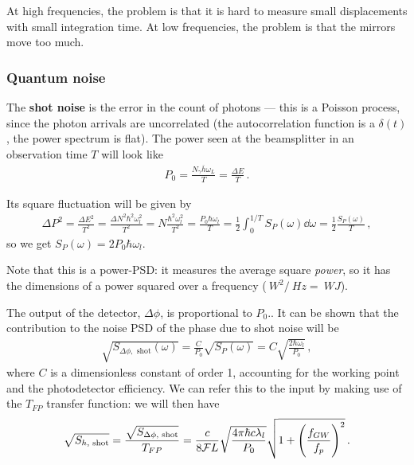\documentclass[main.tex]{subfiles}
\begin{document}

At high frequencies, the problem is that it is hard to measure small displacements with small integration time. 
At low frequencies, the problem is that the mirrors move too much. 

\subsubsection{Quantum noise}

The \textbf{shot noise} is the error in the count of photons --- this is a Poisson process, since the photon arrivals are uncorrelated (the autocorrelation function is a \(\delta (t)\), the power spectrum is flat).
The power seen at the beamsplitter in an observation time \(T\) will look like 
%
\begin{align}
P_0  = \frac{N_\gamma \overline{h}\omega_{L}}{T} = \frac{\Delta E}{T}
\,.
\end{align}

Its square fluctuation will be given by
%
\begin{align}
\Delta P^2 = \frac{\Delta E^2}{T^2} = 
\frac{\Delta N^2 \hbar^2 \omega_{l}^2}{T^2}
= N \frac{\hbar^2   \omega_{l}^2}{T^2}
= \frac{P_0 \hbar \omega_{l}}{T}
= \frac{1}{2} \int_{0}^{1/T} S_P (\omega) \dd{\omega }
= \frac{1}{2} \frac{S_P(\omega )}{T}
\,,
\end{align}
%
so we get \(S_P (\omega ) = 2 P_0 \hbar \omega_{l}\). 

Note that this is a power-PSD: it measures the average square \emph{power}, so it has the dimensions of a power squared over a frequency (\(\SI{}{W^2}/\SI{}{Hz} = \SI{}{W J}\)). 

The output of the detector, \(\Delta \phi \), is proportional to \(P_0\)..
It can be shown that the contribution to the noise PSD of the phase due to shot noise will be 
%
\begin{align}
\sqrt{S_{\Delta \phi , \text{ shot}} (\omega )}  = 
\frac{C}{P_0 } \sqrt{S_{P} (\omega )} = C \sqrt{\frac{2 \hbar \omega_{l}}{P_0 }}
\,,
\end{align}
%
where \(C\) is a dimensionless constant of order 1, accounting for the working point and the photodetector efficiency. 
We can refer this to the input by making use of the \(T_{FP}\) transfer function: we will then have 
%
\begin{align}
\sqrt{S_{h, \text{ shot}}} = \frac{\sqrt{S_{\Delta \phi, \text{ shot}}}}{T_{FP}} =
\frac{c}{8 \mathcal{F} L} \sqrt{\frac{4 \pi \hbar c \lambda_{l}}{P_0 }}
\sqrt{1 + \qty( \frac{f_{GW}}{f_{p}})^2}
\,.
\end{align}
\end{document}
